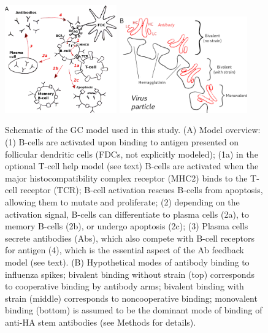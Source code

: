 \documentclass[utf8]{frontiersHLTH}%
\newcommand{\hfig}[1]{#1} %
\begin{document}
\hfig{
\begin{figure}
\centering
\includegraphics[width=0.43\textwidth,valign=t]{model2i.png}
\hspace{2EM}
\includegraphics[width=0.49\textwidth,valign=t]{ab-ha-avidity3.png}
\caption{Schematic of the GC model used in this study. (A) Model overview: (1) B-cells are activated upon binding to antigen presented on
follicular dendritic cells (FDCs, not explicitly modeled); (1a) in the optional T-cell help model (see text) B-cells are
activated when the major histocompatibility complex receptor (MHC2) binds to the T-cell receptor (TCR); B-cell activation rescues
B-cells from apoptosis, allowing them to mutate and proliferate; (2) depending on the activation signal,
B-cells can differentiate to plasma cells (2a), to memory B-cells (2b), or undergo apoptosis (2c); (3) Plasma cells secrete antibodies
(Abs), which also compete with B-cell receptors for antigen (4), which is the essential aspect of the Ab feedback model\cite{zhang13}
(see text). (B) Hypothetical modes of antibody binding to influenza spikes; bivalent binding without strain (top) corresponds to
cooperative binding by antibody arms; bivalent binding with strain (middle) corresponds to noncooperative binding; monovalent binding (bottom) is assumed to be the
dominant mode of binding of anti-HA stem antibodies (see Methods for details).
}
\label{fig:model}
\end{figure}
}
\end{document}
